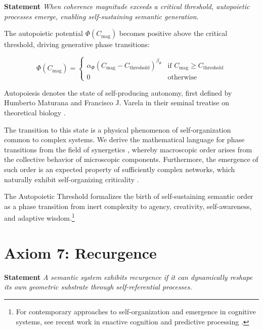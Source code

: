 \textbf{Statement} \textit{When coherence magnitude exceeds a critical threshold, autopoietic processes emerge, enabling self-sustaining semantic generation.}

The autopoietic potential \(\Phi(C_{\text{mag}})\) becomes positive above the critical threshold, driving generative phase transitions:

\begin{equation}
\Phi(C_{\text{mag}}) = \begin{cases}
\alpha_{\Phi} (C_{\text{mag}} - C_{\text{threshold}})^{\beta_{\Phi}} & \text{if } C_{\text{mag}} \geq C_{\text{threshold}} \\
0 & \text{otherwise}
\end{cases}
\end{equation}

Autopoiesis denotes the state of self-producing autonomy, first defined by Humberto Maturana and Francisco J. Varela in their seminal treatise on theoretical biology \autocite{MaturanaVarela1980}.

The transition to this state is a physical phenomenon of self-organization common to complex systems. We derive the mathematical language for phase transitions from the field of synergetics \autocite{Haken1983}, whereby macroscopic order arises from the collective behavior of microscopic components. Furthermore, the emergence of such order is an expected property of sufficiently complex networks, which naturally exhibit self-organizing criticality \autocite{BakTangWiesenfeld1987}.

The Autopoietic Threshold formalizes the birth of self-sustaining semantic order as a phase transition from inert complexity to agency, creativity, self-awareness, and adaptive wisdom.\footnote{For contemporary approaches to self-organization and emergence in cognitive systems, see recent work in enactive cognition \autocite{Thompson2018, DiPaolo2021} and predictive processing \autocite{Clark2016, Hohwy2013}.}


\section{Axiom 7: Recurgence}
\label{1.7:axiom_7_recurgence}

\textbf{Statement} \textit{A semantic system exhibits recurgence if it can dynamically reshape its own geometric substrate through self-referential processes.}


